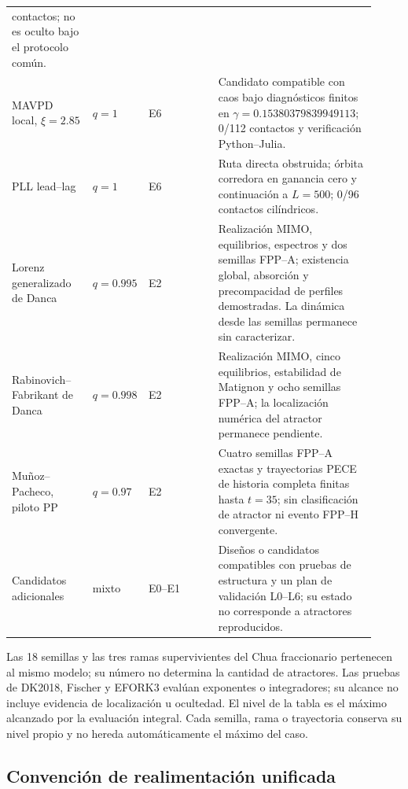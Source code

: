 \begin{longtable}{@{}L{0.22\linewidth}C{0.08\linewidth}L{0.19\linewidth}L{0.43\linewidth}@{}}
contactos; no es oculto bajo el protocolo común.\\
MAVPD local, \(\xi=2.85\) & \(q=1\) & E6 & Candidato compatible con caos bajo
diagnósticos finitos en \(\gamma=0.15380379839949113\); 0/112 contactos y
verificación Python--Julia.\\
PLL lead--lag & \(q=1\) & E6 & Ruta directa obstruida; órbita corredora en
ganancia cero y continuación a \(L=500\); 0/96 contactos cilíndricos.\\
Lorenz generalizado de Danca & \(q=0.995\) & E2 & Realización MIMO,
equilibrios, espectros y dos semillas FPP--A; existencia global,
absorción y precompacidad de perfiles demostradas. La dinámica desde las
semillas permanece sin caracterizar.\\
Rabinovich--Fabrikant de Danca & \(q=0.998\) & E2 & Realización MIMO,
cinco equilibrios, estabilidad de Matignon y ocho semillas FPP--A;
la localización numérica del atractor permanece pendiente.\\
Muñoz--Pacheco, piloto PP & \(q=0.97\) & E2 & Cuatro semillas FPP--A exactas y
trayectorias PECE de historia completa finitas hasta \(t=35\); sin
clasificación de atractor ni evento FPP--H convergente.\\
Candidatos adicionales & mixto & E0--E1 & Diseños o candidatos compatibles
con pruebas de estructura y un plan de validación L0--L6; su estado no corresponde a
atractores reproducidos.\\
\bottomrule
\end{longtable}

\ifHAFOdigitalcontent
Las 18 semillas y las tres ramas supervivientes del Chua fraccionario
pertenecen al mismo modelo; su número no determina la cantidad de atractores.
Las pruebas de DK2018, Fischer y EFORK3 evalúan exponentes o integradores; su alcance
no incluye evidencia de localización u ocultedad.
El nivel de la tabla es el máximo alcanzado por la evaluación integral. Cada
semilla, rama o trayectoria conserva su nivel propio y no hereda
automáticamente el máximo del caso.
\fi

\subsection{Convención de realimentación unificada}


